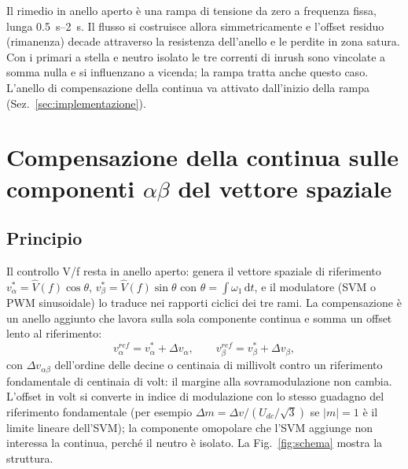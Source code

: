 \documentclass[10pt,a4paper]{scrartcl}
\newcommand{\dif}{\mathrm{d}}
\newcommand{\ab}{\alpha\beta}
\newcommand{\dvab}{\Delta v_{\ab}}
\newcommand{\Udc}{U_{dc}}
\begin{document}
\begin{onehalfspace}
Il rimedio in anello aperto è una rampa di tensione da zero a frequenza fissa, lunga \SIrange{0.5}{2}{s}. Il flusso si costruisce allora simmetricamente e l'offset residuo (rimanenza) decade attraverso la resistenza dell'anello e le perdite in zona satura. Con i primari a stella e neutro isolato le tre correnti di inrush sono vincolate a somma nulla e si influenzano a vicenda; la rampa tratta anche questo caso. L'anello di compensazione della continua va attivato dall'inizio della rampa (Sez.~\ref{sec:implementazione}).

\section{Compensazione della continua sulle componenti \texorpdfstring{$\alpha\beta$}{alfa-beta} del vettore spaziale}
\label{sec:compensazione}

\subsection{Principio}
\label{sec:principio}

Il controllo V/f resta in anello aperto: genera il vettore spaziale di riferimento $v^*_\alpha = \hat V(f)\cos\theta$, $v^*_\beta = \hat V(f)\sin\theta$ con $\theta = \int\omega_1\,\dif t$, e il modulatore (SVM o PWM sinusoidale) lo traduce nei rapporti ciclici dei tre rami. La compensazione è un anello aggiunto che lavora sulla sola componente continua e somma un offset lento al riferimento:
\begin{equation}
v_\alpha^{ref} = v_\alpha^* + \Delta v_\alpha, \qquad v_\beta^{ref} = v_\beta^* + \Delta v_\beta ,
\label{eq:somma}
\end{equation}
con $\dvab$ dell'ordine delle decine o centinaia di millivolt contro un riferimento fondamentale di centinaia di volt: il margine alla sovramodulazione non cambia. L'offset in volt si converte in indice di modulazione con lo stesso guadagno del riferimento fondamentale (per esempio $\Delta m = \Delta v/(\Udc/\sqrt3)$ se $|m| = 1$ è il limite lineare dell'SVM); la componente omopolare che l'SVM aggiunge non interessa la continua, perché il neutro è isolato. La Fig.~\ref{fig:schema} mostra la struttura.


\end{onehalfspace}
\end{document}
